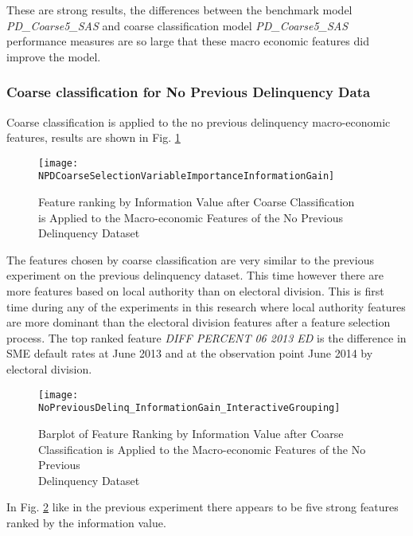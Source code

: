 These are strong results, the differences between the benchmark model \textit{PD\_Coarse5\_SAS} and coarse classification model \textit{PD\_Coarse5\_SAS} performance measures are so large that these macro economic features did improve the model.


\subsubsection{Coarse classification for No Previous Delinquency Data}

Coarse classification is applied to the no previous delinquency macro-economic features, results are shown in Fig. \ref{fig:NPDCoarseSelectionVariableImportanceInformationGain}

\begin{figure}[H]
	\texttt{[image: NPDCoarseSelectionVariableImportanceInformationGain]}
	\caption{Feature ranking by Information Value after Coarse Classification \\is Applied to the Macro-economic Features of the No Previous Delinquency Dataset}
	\label{fig:NPDCoarseSelectionVariableImportanceInformationGain}
\end{figure}


The features chosen by coarse classification are very similar to the previous experiment on the previous delinquency dataset. This time however there are more features based on local authority than on electoral division. This is first time during any of the experiments in this research where local authority features are more dominant than the electoral division features after a feature selection process. The top ranked feature \textit{DIFF PERCENT 06 2013 ED} is the difference in SME default rates at June 2013 and at the observation point June 2014 by electoral division. 

\begin{figure}[H]
	\texttt{[image: NoPreviousDelinq\_InformationGain\_InteractiveGrouping]}
	\caption{Barplot of Feature Ranking by Information Value after Coarse \\ Classification is Applied to the Macro-economic Features of the No Previous\\ Delinquency Dataset}
	\label{fig:Information Value using SAS No Previous Delinquency Features}
\end{figure}

In Fig. \ref{fig:Information Value using SAS No Previous Delinquency Features} like in the previous experiment there appears to be five strong features ranked by the information value. 

